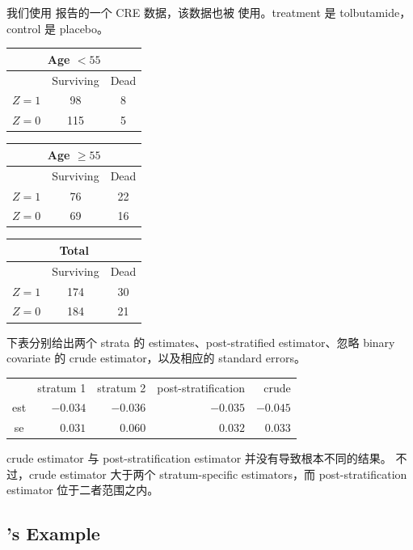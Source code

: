 我们使用 \citet{meinert1970study} 报告的一个 CRE 数据，该数据也被 \citet{rothman2008modern} 使用。treatment 是 tolbutamide，control 是 placebo。
\begin{center} 
\begin{tabular}{ccc}
\multicolumn{3}{c}{ Age $< 55$} \\
\hline 
 & Surviving & Dead \\
$Z=1$ &    98 & 8 \\
$Z=0$  & 115 & 5 \\
\hline 
\end{tabular}
\begin{tabular}{ccc}
\multicolumn{3}{c}{ Age $\geq  55$} \\
\hline 
 & Surviving & Dead \\
$Z=1$ &    76 & 22 \\
$Z=0$  &  69 & 16 \\
\hline 
\end{tabular}
\begin{tabular}{ccc}
\multicolumn{3}{c}{Total } \\
\hline 
 & Surviving & Dead \\
$Z=1$ &    174 & 30 \\
$Z=0$  & 184 & 21 \\
\hline 
\end{tabular}
\end{center}
 

下表分别给出两个 strata 的 estimates、post-stratified estimator、忽略 binary covariate 的 crude estimator，以及相应的 standard errors。
\begin{center}
\begin{tabular}{crrrr}
\hline 
    &stratum 1& stratum 2 &post-stratification &  crude \\
est &    $-0.034$ &   $-0.036$ &  $-0.035$ & $-0.045$ \\
se   &   $0.031$    & $0.060$   & $0.032$   & $0.033$\\
\hline 
\end{tabular}
\end{center} 


crude estimator 与 post-stratification estimator 并没有导致根本不同的结果。
不过，crude estimator 大于两个 stratum-specific estimators，而 post-stratification estimator 位于二者范围之内。


\subsection{\citet{chong2016iron}'s Example}\label{sec::ps-chong}


